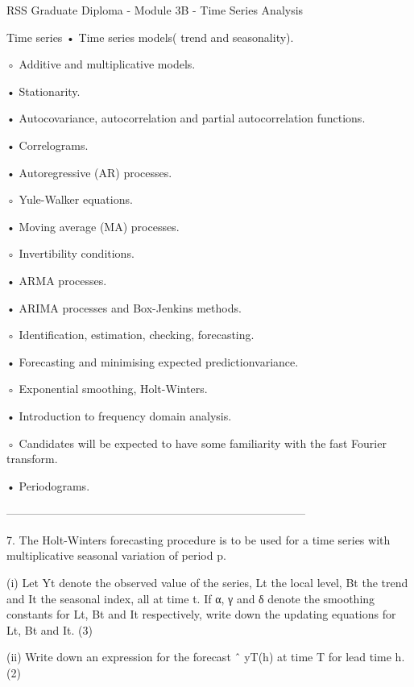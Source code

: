 
RSS Graduate Diploma - Module 3B -  Time Series Analysis

 

Time series
•
Time series models( trend and seasonality).

◦
Additive and multiplicative models.

•
Stationarity.

•
Autocovariance, autocorrelation and partial autocorrelation functions.

•
Correlograms.

•
Autoregressive (AR) processes.

◦
Yule-Walker equations.

•
Moving average (MA) processes.

◦
Invertibility conditions.

•
ARMA processes.

•
ARIMA processes and Box-Jenkins methods.

◦
Identification, estimation, checking, forecasting.

•
Forecasting and minimising expected predictionvariance.

◦
Exponential smoothing, Holt-Winters.

•
Introduction to frequency domain analysis.

◦
Candidates will be expected to have some
familiarity with the fast Fourier transform.

•
Periodograms.


 

 

 

 

 

 

 




--------------------------------------------------------------------------------


7. The Holt-Winters forecasting procedure is to be used for a time series with multiplicative seasonal variation of period p.


(i) Let Yt denote the observed value of the series, Lt the local level, Bt the trend and It the seasonal index, all
at time t. If α, γ and δ denote the smoothing constants for Lt, Bt and It respectively, write down the updating equations for Lt, Bt and It. (3)

(ii) Write down an expression for the forecast ˆ yT(h) at time T for lead time h.(2)

 
 
